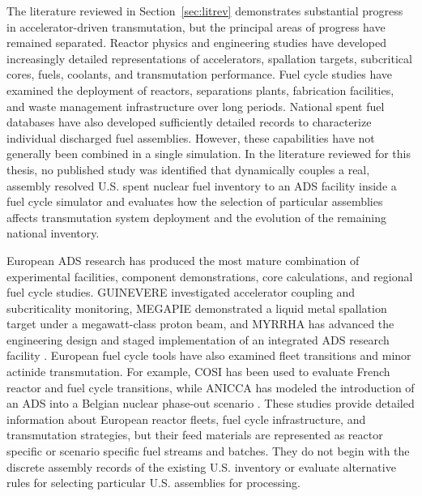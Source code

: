 The literature reviewed in Section~\ref{sec:litrev} demonstrates substantial
progress in accelerator-driven transmutation, but the principal areas of
progress have remained separated. Reactor physics and engineering studies
have developed increasingly detailed representations of accelerators,
spallation targets, subcritical cores, fuels, coolants, and transmutation
performance. Fuel cycle studies have examined the deployment of reactors,
separations plants, fabrication facilities, and waste management
infrastructure over long periods. National spent fuel databases have also
developed sufficiently detailed records to characterize individual discharged
fuel assemblies. However, these capabilities have not generally been combined
in a single simulation. In the literature reviewed for this thesis, no
published study was identified that dynamically couples a real,
assembly resolved U.S. spent nuclear fuel inventory to an \gls{ADS} facility inside
a fuel cycle simulator and evaluates how the selection of particular
assemblies affects transmutation system deployment and the evolution of the
remaining national inventory.

European \gls{ADS} research has produced the most mature combination of
experimental facilities, component demonstrations, core calculations, and
regional fuel cycle studies. \gls{GUINEVERE} investigated accelerator coupling and
subcriticality monitoring, \gls{MEGAPIE} demonstrated a liquid metal spallation
target under a megawatt-class proton beam, and \gls{MYRRHA} has advanced the
engineering design and staged implementation of an integrated \gls{ADS} research
facility
\cite{aitabderrahim_myrrha_2001,billebaud_guinevere_2009,
uyttenhove_experimental_2011,wagner_megapie_2008,
dordaImplementationStatusMyrrha2024}. European fuel cycle tools have also
examined fleet transitions and minor actinide transmutation. For example,
\gls{COSI} has been used to evaluate French reactor and fuel cycle transitions,
while \gls{ANICCA} has modeled the introduction of an \gls{ADS} into a Belgian nuclear
phase-out scenario
\cite{coquelet_pascal_cosi6_2015,rodriguez_nuclear_2020}.
These studies provide detailed information about European reactor fleets,
fuel cycle infrastructure, and transmutation strategies, but their feed
materials are represented as reactor specific or scenario specific fuel
streams and batches. They do not begin with the discrete assembly records of
the existing U.S. inventory or evaluate alternative rules for selecting
particular U.S. assemblies for processing.

